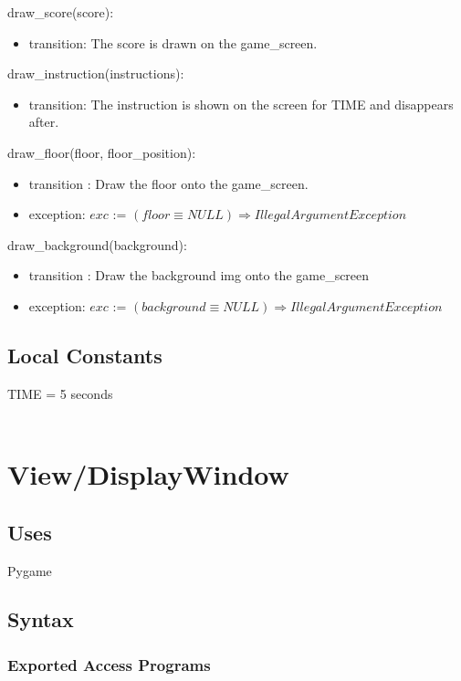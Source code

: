 \documentclass[12pt]{article}
\begin{document}
\noindent draw\_score(score):
\begin{itemize}
    \item transition: The score is drawn on the game\_screen.
\end{itemize}

\noindent draw\_instruction(instructions):
\begin{itemize}
    \item transition: The instruction is shown on the screen for TIME and disappears after.
\end{itemize}

\noindent draw\_floor(floor, floor\_position):
\begin{itemize}
    \item transition : Draw the floor onto the game\_screen.
    \item exception: $exc$ := $(floor \equiv NULL) \Rightarrow IllegalArgumentException $
\end{itemize}

\noindent draw\_background(background):
\begin{itemize}
    \item transition : Draw the background img onto the game\_screen
    \item exception: $exc$ := $(background \equiv NULL) \Rightarrow IllegalArgumentException $
\end{itemize}

\subsection*{Local Constants}
TIME = 5 seconds\\\
\newpage
\section*{View/DisplayWindow}

\subsection* {Uses}
Pygame

\subsection* {Syntax}

\subsubsection* {Exported Access Programs}
\end{document}
